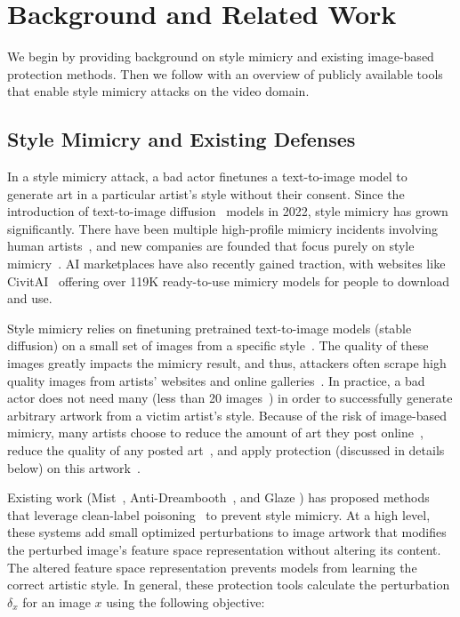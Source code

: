 
\section{Background and Related Work}
\label{sec:back}

We begin by providing background on style mimicry and existing image-based protection methods. Then we follow with an overview of publicly available tools that enable style mimicry attacks on the video domain.

\subsection{Style Mimicry and Existing Defenses}
\label{sec:back1}
In a style mimicry attack, a bad actor finetunes a text-to-image model to
generate art in a particular artist's style without their consent. 
Since the introduction of text-to-image diffusion~\cite{sd-release,podell2023sdxl,df,novelai-update,ramesh2022hierarchical} models in 2022, style mimicry has grown significantly. There have been multiple high-profile mimicry incidents involving human artists~\cite{hollie-steal,sarah-andersen,lensa-steal,sam-steal}, and new companies are founded that focus purely on style mimicry~\cite{aigame,lexica}. AI marketplaces have also recently gained traction, with websites like CivitAI~\cite{civitai} offering over 119K ready-to-use mimicry models for people to download and use.

Style mimicry relies on finetuning pretrained text-to-image models (\eg stable diffusion) on a small set of images from a specific style~\cite{ruiz2022dreambooth,finetune-c,gal2022image}. The quality of these images greatly impacts the mimicry result, and thus, attackers often scrape high quality images from artists' websites and online galleries~\cite{hollie-steal,sam-steal}. In practice, a bad actor does not need many (less than 20 images~\cite{shan2023glaze,gal2022image}) in order to successfully generate arbitrary artwork from a victim artist's style. Because of the risk of image-based mimicry, many artists choose to reduce the amount of art they post online~\cite{aiprotest}, reduce the quality of any posted art~\cite{lowres}, and apply protection (discussed in details below) on this artwork~\cite{shan2023glaze}. 

Existing work (Mist~\cite{mist}, Anti-Dreambooth~\cite{antidb}, and Glaze \cite{shan2023glaze}) has 
proposed methods that leverage clean-label poisoning~\cite{saha2020hidden, turner2018clean, zhu2019transferable} to prevent style mimicry. At a high level, these systems add small optimized perturbations to image artwork that modifies the perturbed image's feature space representation without altering its content. The altered feature space representation prevents models from learning the correct artistic style. In general, these protection tools calculate the perturbation $\delta_x$ for an image $x$ using the following objective: 

